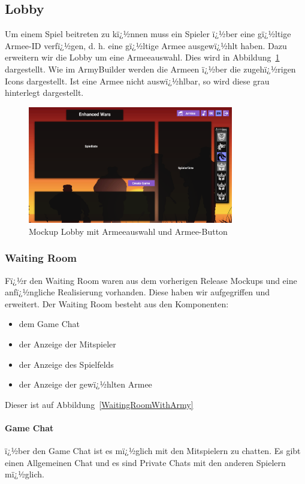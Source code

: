 \documentclass[12pt, titlepage]{scrartcl}
\newcommand{\Abb}[1]{%
	Abbildung\ \ref{#1}%
}
\begin{document}
		\subsection{Lobby}
		Um einem Spiel beitreten zu kï¿½nnen muss ein Spieler ï¿½ber eine gï¿½ltige Armee-ID verfï¿½gen, d. h. eine gï¿½ltige Armee ausgewï¿½hlt haben. Dazu erweitern wir die Lobby um eine Armeeauswahl. Dies wird in \Abb{Lobby_with_Army} dargestellt. Wie im ArmyBuilder werden die Armeen ï¿½ber die zugehï¿½rigen Icons dargestellt. Ist eine Armee nicht auswï¿½hlbar, so wird diese grau hinterlegt dargestellt. 
		\begin{figure}[H] 
			\centering
			\includegraphics[width=0.8\textwidth]{Lobby_mit_Army_Button_und_Armeeliste.png}
			\caption{Mockup Lobby mit Armeeauswahl und Armee-Button}
			\label{Lobby_with_Army}
		\end{figure}
		
		\subsubsection{Waiting Room}
		Fï¿½r den Waiting Room waren aus dem vorherigen Release Mockups und eine anfï¿½ngliche Realisierung vorhanden. Diese haben wir aufgegriffen und erweitert. Der Waiting Room besteht aus den Komponenten:
		\begin{itemize}
			\item dem Game Chat
			\item der Anzeige der Mitspieler
			\item der Anzeige des Spielfelds
			\item der Anzeige der gewï¿½hlten Armee
		\end{itemize}
		Dieser ist auf \Abb{WaitingRoomWithArmy}
		\paragraph{Game Chat}
		ï¿½ber den Game Chat ist es mï¿½glich mit den Mitspielern zu chatten. Es gibt einen Allgemeinen Chat und es sind Private Chats mit den anderen Spielern mï¿½glich.
\end{document}
